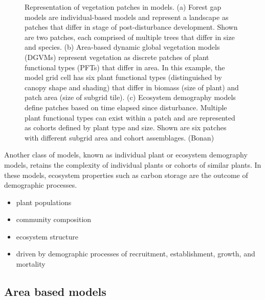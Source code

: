 \documentclass[12pt,oneside]{book}
\providecommand{\tightlist}{%
  \setlength{\itemsep}{0pt}\setlength{\parskip}{0pt}}
\begin{document}
\begin{figure}
{}

\caption{Representation of vegetation patches in models. (a) Forest gap models are individual-based models and represent a landscape as patches that differ in stage of post-disturbance development. Shown are two patches, each comprised of multiple trees that differ in size and species. (b) Area-based dynamic global vegetation models (DGVMs) represent vegetation as discrete patches of plant functional types (PFTs) that differ in area. In this example, the model grid cell has six plant functional types (distinguished by canopy shape and shading) that differ in biomass (size of plant) and patch area (size of subgrid tile). (c) Ecosystem demography models define patches based on time elapsed since disturbance. Multiple plant functional types can exist within a patch and are represented as cohorts defined by plant type and size. Shown are six patches with different subgrid area and cohort assemblages. (Bonan)}\label{fig:f63}
\end{figure}

Another class of models, known as individual plant or ecosystem
demography models, retains the complexity of individual plants or
cohorts of similar plants. In these models, ecosystem properties such as
carbon storage are the outcome of demographic processes.

\begin{itemize}
\tightlist
\item
  plant populations
\item
  community composition
\item
  ecosystem structure
\item
  driven by demographic processes of recruitment, establishment, growth,
  and mortality
\end{itemize}

\subsection{Area based models}\label{area-based-models}
\end{document}
